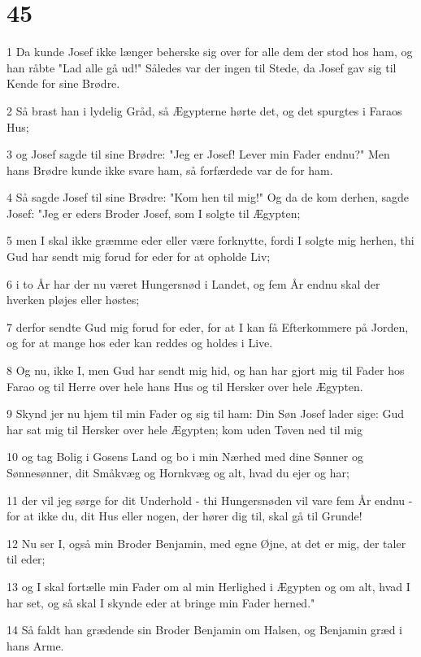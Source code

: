 \chapter{45}

\par 1 Da kunde Josef ikke længer beherske sig over for alle dem der stod hos ham, og han råbte "Lad alle gå ud!" Således var der ingen til Stede, da Josef gav sig til Kende for sine Brødre.
\par 2 Så brast han i lydelig Gråd, så Ægypterne hørte det, og det spurgtes i Faraos Hus;
\par 3 og Josef sagde til sine Brødre: "Jeg er Josef! Lever min Fader endnu?" Men hans Brødre kunde ikke svare ham, så forfærdede var de for ham.
\par 4 Så sagde Josef til sine Brødre: "Kom hen til mig!" Og da de kom derhen, sagde Josef: "Jeg er eders Broder Josef, som I solgte til Ægypten;
\par 5 men I skal ikke græmme eder eller være forknytte, fordi I solgte mig herhen, thi Gud har sendt mig forud for eder for at opholde Liv;
\par 6 i to År har der nu været Hungersnød i Landet, og fem År endnu skal der hverken pløjes eller høstes;
\par 7 derfor sendte Gud mig forud for eder, for at I kan få Efterkommere på Jorden, og for at mange hos eder kan reddes og holdes i Live.
\par 8 Og nu, ikke I, men Gud har sendt mig hid, og han har gjort mig til Fader hos Farao og til Herre over hele hans Hus og til Hersker over hele Ægypten.
\par 9 Skynd jer nu hjem til min Fader og sig til ham: Din Søn Josef lader sige: Gud har sat mig til Hersker over hele Ægypten; kom uden Tøven ned til mig
\par 10 og tag Bolig i Gosens Land og bo i min Nærhed med dine Sønner og Sønnesønner, dit Småkvæg og Hornkvæg og alt, hvad du ejer og har;
\par 11 der vil jeg sørge for dit Underhold - thi Hungersnøden vil vare fem År endnu - for at ikke du, dit Hus eller nogen, der hører dig til, skal gå til Grunde!
\par 12 Nu ser I, også min Broder Benjamin, med egne Øjne, at det er mig, der taler til eder;
\par 13 og I skal fortælle min Fader om al min Herlighed i Ægypten og om alt, hvad I har set, og så skal I skynde eder at bringe min Fader herned."
\par 14 Så faldt han grædende sin Broder Benjamin om Halsen, og Benjamin græd i hans Arme.
